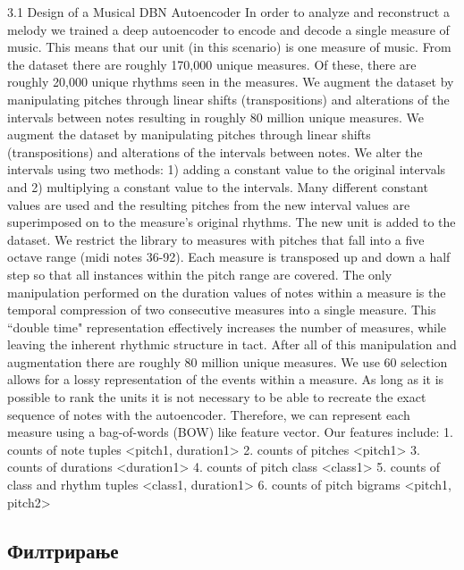 \cite{Bretan2016} 3.1 Design of a Musical DBN Autoencoder
In order to analyze and reconstruct a melody we trained a deep autoencoder to encode and decode a single measure of music. This means that our unit (in this scenario) is one measure of music. From the dataset there are roughly 170,000 unique measures. Of these, there are roughly 20,000 unique rhythms seen in the measures. We augment the dataset by manipulating pitches through linear shifts (transpositions) and alterations of the intervals between notes resulting in roughly 80 million unique measures. We augment the dataset by manipulating pitches through linear shifts (transpositions) and alterations
of the intervals between notes. We alter the intervals using two methods: 1) adding a constant value to the original intervals and 2) multiplying a constant value to the intervals. Many different constant values are used and the resulting pitches from the new interval values are superimposed on to the measure’s original rhythms. The new unit is added to the dataset. We restrict the library to measures with pitches that fall into a five octave range (midi notes 36-92). Each measure is transposed up and down a half step so that all instances within the pitch range are covered. The only manipulation performed on the duration values of notes within a measure is the temporal compression of two consecutive measures into a single measure. This “double time" representation effectively increases the number of measures, while leaving the inherent rhythmic structure in tact. After all of this manipulation and augmentation there are roughly 80 million unique measures. We use 60%
selection allows for a lossy representation of the events within a measure. As long as it is possible to rank the units it is not necessary to be able to recreate the exact sequence of notes with the autoencoder. Therefore, we can represent each measure using a bag-of-words (BOW) like feature vector. Our features include:
1. counts of note tuples <pitch1, duration1> 2. counts of pitches <pitch1> 3. counts of durations <duration1> 4. counts of pitch class <class1> 5. counts of class and rhythm tuples <class1, duration1> 6. counts of pitch bigrams <pitch1, pitch2>

\subsection{Филтрирање}



